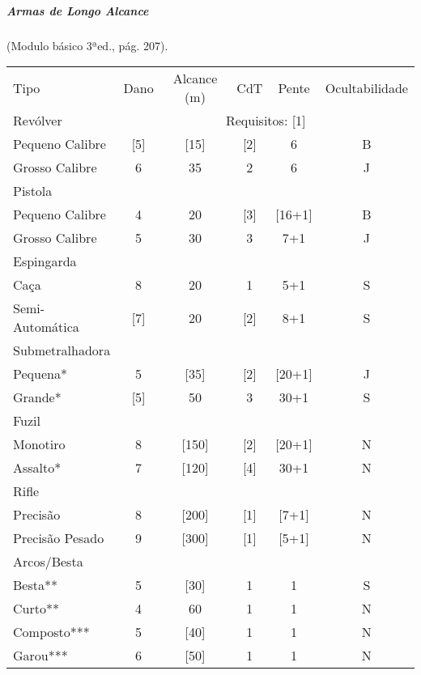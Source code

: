 \subparagraph{\bf Armas de Longo Alcance} (Modulo básico 3ªed., pág. 207).

\begin{table}[!ht]
\centering
\label{Armas_alcance}
\begin{tabular}{|l c c c c c|}
\hline
Tipo 			&	Dano	&	Alcance (m)	&	CdT	&	Pente	&	Ocultabilidade \\

\rowcolor[HTML]{EFEFEF} 
Revólver		&	\multicolumn{5}{c|}{Requisitos: [1]} \\%
Pequeno Calibre	&	[5]		&	[15]		& [2] 	& 6 	& B		\\
Grosso Calibre	&	6		&	35			& 2 	& 6 	& J		\\

\rowcolor[HTML]{EFEFEF} 
Pistola			&			&				&  		& 		&  		\\
Pequeno Calibre	&	4		&	20			& [3] 	& [16+1]& B		\\
Grosso Calibre	&	5		&	30			& 3 	& 7+1	& J		\\

\rowcolor[HTML]{EFEFEF} 
Espingarda		&			&				&  		& 		&  		\\
Caça			&	8		&	20			& 1 	& 5+1	& S		\\
Semi-Automática	&	[7]		&	20			& [2] 	& 8+1	& S		\\

\rowcolor[HTML]{EFEFEF} 
Submetralhadora	&			&				&  		& 		&  		\\
Pequena*		&	5		&	[35]		& [2] 	& [20+1]& J		\\
Grande*			&	[5]		&	50			& 3 	& 30+1	& S		\\

\rowcolor[HTML]{EFEFEF} 
Fuzil			&			&				&  		& 		&  		\\
Monotiro		&	8		&	[150]		& [2] 	& [20+1]& N		\\
Assalto*		&	7		&	[120]		& [4] 	& 30+1	& N		\\

\rowcolor[HTML]{EFEFEF} 
Rifle			&			&				&  		& 		&  		\\
Precisão		&	8		&	[200]		& [1] 	& [7+1] & N		\\
Precisão Pesado	&	9		&	[300]		& [1] 	& [5+1]	& N		\\

\rowcolor[HTML]{EFEFEF} 
Arcos/Besta		&			&				&  		& 		&  		\\
Besta**			&	5		&	[30]		& 1 	& 	1	& S		\\
Curto**			&	4		&	60			& 1 	& 	1	& N		\\
Composto***		&	5		&	[40]		& 1 	& 	1	& N		\\
Garou***		&	6		&	[50]		& 1 	& 	1	& N		\\

\hline
\end{tabular}
\end{table}

